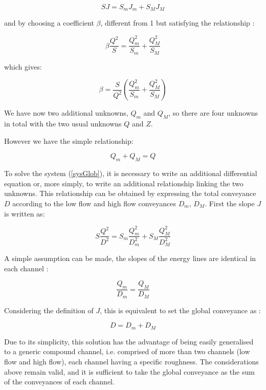 \begin{equation}
  SJ = S_m J_m + S_M J_M
\end{equation}

and by choosing a coefficient $\beta$, different from 1 but satisfying the relationship :

\begin{equation}
  \beta \frac{Q^2}{S} = \frac{Q_{m}^2}{S_m} + \frac{Q_{M}^2}{S_M}
\end{equation}

which gives:

\begin{equation}
  \beta =  \frac{S}{Q^2} \left ( \frac{Q_{m}^2}{S_m} + \frac{Q_{M}^2}{S_M} \right )
\end{equation}

We have now two additional unknowns, $Q_m$ and $Q_M$, so there are four unknowns in total with the two usual unknowns $Q$ and $Z$.

However we have the simple relationship:

\begin{equation}
  Q_m + Q_M = Q
\end{equation}

To solve the system (\ref{sysGlob}), it is necessary to write an additional differential equation or, more simply, to write an additional relationship linking the two unknowns. This relationship can be obtained by expressing the total conveyance $D$ according to the low flow and high flow conveyances $D_m$, $D_M$. First the slope $J$ is written as:

\begin{equation}
  S \frac{Q^2}{D^2} = S_m \frac{Q_{m}^2}{D_{m}^2} + S_M \frac{Q_{M}^2}{D_{M}^2}
\end{equation}

A simple assumption can be made, the slopes of the energy lines are identical in each channel :

\begin{equation}
  \frac{Q_m}{D_m} = \frac{Q_M}{D_M}
\end{equation}

Considering the definition of $J$, this is equivalent to set the global \linebreak conveyance as :

\begin{equation}
  D = D_m + D_M
\end{equation}

Due to its simplicity, this solution has the advantage of being easily generalised to a generic compound channel, i.e. comprised of more than two channels (low flow and high flow), each channel having a specific roughness. The considerations above remain valid, and it is sufficient to take the global conveyance as the sum of the conveyances of each channel.

